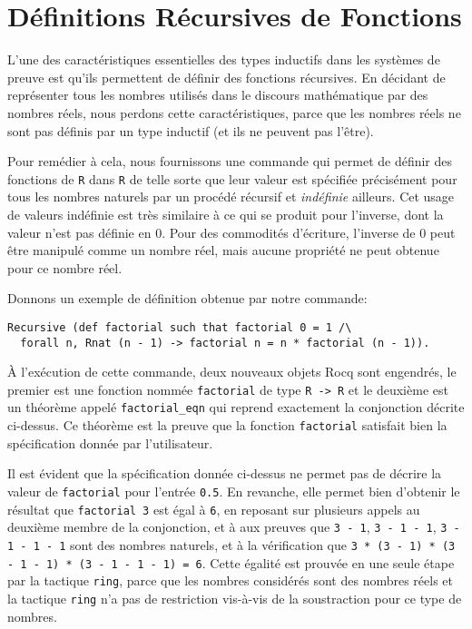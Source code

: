 \documentclass[draft]{jflart}
\begin{document}
\section{Définitions Récursives de Fonctions}
L'une des caractéristiques essentielles des types inductifs dans les
systèmes de preuve est qu'ils permettent de définir des fonctions
récursives.  En décidant de représenter tous les nombres utilisés dans
le discours mathématique par des nombres réels, nous perdons cette
caractéristiques, parce que les nombres réels ne sont pas définis par
un type inductif (et ils ne peuvent pas l'être).

Pour remédier à cela, nous fournissons une commande qui permet de
définir des fonctions de \texttt{R} dans \texttt{R} de telle sorte que leur
valeur est spécifiée précisément pour tous les nombres naturels par un
procédé récursif et {\em indéfinie} ailleurs.  Cet usage de valeurs
indéfinie est très similaire à ce qui se produit pour l'inverse, dont
la valeur n'est pas définie en 0.  Pour des commodités d'écriture,
l'inverse de 0 peut être manipulé comme un nombre réel, mais aucune
propriété ne peut obtenue pour ce nombre réel.

Donnons un exemple de définition obtenue par notre commande:
\begin{verbatim}
Recursive (def factorial such that factorial 0 = 1 /\
  forall n, Rnat (n - 1) -> factorial n = n * factorial (n - 1)).
\end{verbatim}
À l'exécution de cette commande, deux nouveaux objets Rocq sont
engendrés, le premier est une fonction nommée \texttt{factorial} de
type \texttt{R -> R} et le
deuxième est un théorème appelé \texttt{factorial\_eqn}
qui reprend exactement la conjonction décrite ci-dessus.  Ce théorème
est la preuve que la fonction \texttt{factorial} satisfait bien la
spécification donnée par l'utilisateur.

Il est évident que la spécification donnée ci-dessus ne permet pas de
décrire la valeur de \texttt{factorial} pour l'entrée \texttt{0.5}.
En revanche, elle permet bien d'obtenir le résultat que
\texttt{factorial 3} est égal à \texttt{6}, en reposant sur plusieurs
appels au deuxième membre de la conjonction, et à aux preuves que
\texttt{3 - 1}, \texttt{3 - 1 - 1}, \texttt{3 - 1 - 1 - 1} sont des
nombres naturels, et à la vérification que \texttt{3 * (3 - 1) * (3 -
  1 - 1) * (3 - 1 - 1 - 1) = 6}.  Cette égalité est prouvée en une
seule étape par la tactique \texttt{ring}, parce que les nombres
considérés sont des nombres réels et la tactique \texttt{ring} n'a pas de
restriction vis-à-vis de la soustraction pour ce type de nombres.
\end{document}
